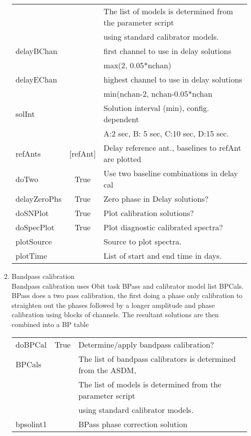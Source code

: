 \documentclass[11pt]{article}
\begin{document}
\begin{enumerate}
\begin{center}
\begin{tabular}{|l|c|l|}
  &  & The list of models is determined from the parameter script \\
  & & using standard calibrator models. \\
delayBChan  &  &  first channel to use in delay solutions \\
  &  &  max(2, 0.05*nchan)\\
delayEChan  &  &  highest channel to use in delay solutions\\
  &  &  min(nchan-2, nchan-0.05*nchan\\
solInt  &  &  Solution interval (min), config. dependent\\
  &  &  A:2 sec, B: 5 sec, C:10 sec, D:15 sec.\\
refAnts  & [refAnt] & Delay reference ant., baselines to refAnt are plotted \\
doTwo  & True &  Use two baseline combinations in delay cal\\
delayZeroPhs &  True &  Zero phase in Delay solutions?\\
doSNPlot       & True &  Plot calibration solutions?\\
doSpecPlot     & True &  Plot diagnostic calibrated spectra?\\
plotSource     & & Source to plot spectra.\\
plotTime       & & List of start and end time in days.\\
\hline
\end{tabular}
\end{center}
\newpage
%
\item Bandpass calibration\\
Bandpass calibration uses Obit task BPass and calibrator model list BPCals.
BPass does a two pass calibration, the first doing a phase only
calibration to straighten out the phases followed by a longer amplitude
and phase calibration using blocks of channels.
The resultant solutions are then combined into a BP table
\begin{center}
\begin{tabular}{|l|c|l|}
\hline
doBPCal  & True &  Determine/apply bandpass calibration? \\
BPCals  &  & The list of bandpass calibrators is determined from the ASDM, \\
  &  & The list of models is determined from the parameter script \\
  & & using standard calibrator models. \\
bpsolint1  &  &  BPass phase correction solution \\

\end{tabular}
\end{center}
\end{enumerate}
\end{document}
